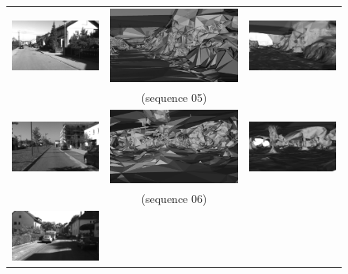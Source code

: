 \begin{figure}[tp]
\centering
\setlength{\tabcolsep}{1px}
\begin{tabular}{ccc}
\includegraphics[height=0.18\textwidth]{./img/ch-incr-dens/05aorig00}&
\includegraphics[height=0.18\textwidth]{./img/ch-incr-dens/05ainit00}&
\includegraphics[height=0.18\textwidth]{./img/ch-incr-dens/05aref00}\\
&(sequence 05)&\\
\includegraphics[height=0.18\textwidth]{./img/ch-incr-dens/06aorig00}&
\includegraphics[height=0.18\textwidth]{./img/ch-incr-dens/06ainit00}&
\includegraphics[height=0.18\textwidth]{./img/ch-incr-dens/06aref00}\\
&(sequence 06)&\\
\includegraphics[height=0.18\textwidth]{./img/ch-incr-dens/07aorig00}&

\end{tabular}
\end{figure}
